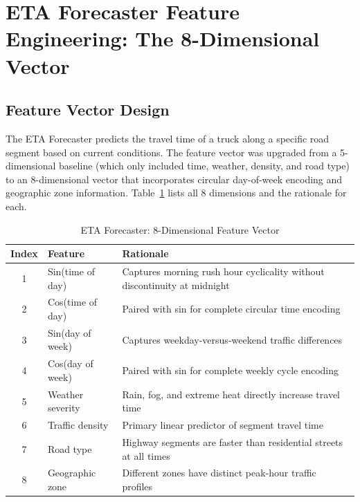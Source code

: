 \section{ETA Forecaster Feature Engineering: The 8-Dimensional Vector}

\subsection{Feature Vector Design}

The ETA Forecaster predicts the travel time of a truck along a specific road
segment based on current conditions. The feature vector was upgraded from a
5-dimensional baseline (which only included time, weather, density, and road type)
to an 8-dimensional vector that incorporates circular day-of-week encoding and
geographic zone information. Table~\ref{tab:eta_features} lists all 8 dimensions
and the rationale for each.

\begin{table}[h!]
\centering
\caption{ETA Forecaster: 8-Dimensional Feature Vector}
\label{tab:eta_features}
\begin{tabular}{|c|l|p{7cm}|}
\hline
\textbf{Index} & \textbf{Feature}         & \textbf{Rationale} \\
\hline
1 & Sin(time of day)          & Captures morning rush hour cyclicality without discontinuity at midnight \\
\hline
2 & Cos(time of day)          & Paired with sin for complete circular time encoding \\
\hline
3 & Sin(day of week)          & Captures weekday-versus-weekend traffic differences \\
\hline
4 & Cos(day of week)          & Paired with sin for complete weekly cycle encoding \\
\hline
5 & Weather severity          & Rain, fog, and extreme heat directly increase travel time \\
\hline
6 & Traffic density           & Primary linear predictor of segment travel time \\
\hline
7 & Road type                 & Highway segments are faster than residential streets at all times \\
\hline
8 & Geographic zone           & Different zones have distinct peak-hour traffic profiles \\
\hline
\end{tabular}
\end{table}

